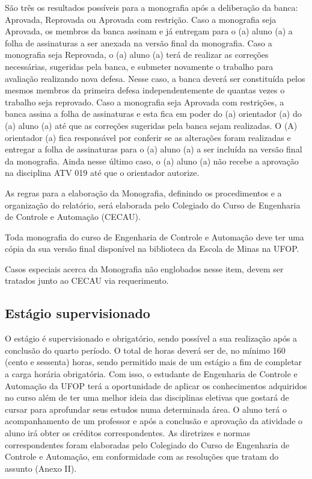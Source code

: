 São três os resultados possíveis para a monografia após a deliberação da banca: Aprovada, Reprovada ou Aprovada com restrição. Caso a monografia seja Aprovada, os membros da banca assinam e já entregam para o (a) aluno (a) a folha de assinaturas a ser anexada na versão final da monografia. Caso a monografia seja Reprovada, o (a) aluno (a) terá de realizar as correções necessárias, sugeridas pela banca, e submeter novamente o trabalho para avaliação realizando nova defesa. Nesse caso, a banca deverá ser constituída pelos mesmos membros da primeira defesa independentemente de quantas vezes o trabalho seja reprovado. Caso a monografia seja Aprovada com restrições, a banca assina a folha de assinaturas e esta fica em poder do (a) orientador (a) do (a) aluno (a) até que as correções sugeridas pela banca sejam realizadas. O (A) orientador (a) fica responsável por conferir se as alterações foram realizadas e entregar a folha de assinaturas para o (a) aluno (a) a ser incluída na versão final da monografia. Ainda nesse último caso, o (a) aluno (a) não recebe a aprovação na disciplina ATV 019 até que o orientador autorize.

As regras para a elaboração da Monografia, definindo os procedimentos e a organização do relatório, será elaborada pelo Colegiado do Curso de Engenharia de Controle e Automação (CECAU).

Toda monografia do curso de Engenharia de Controle e Automação deve ter uma cópia da sua versão final disponível na biblioteca da Escola de Minas na UFOP.

Casos especiais acerca da Monografia não englobados nesse item, devem ser tratados junto ao CECAU via requerimento. 

\subsection*{Estágio supervisionado}
O estágio é supervisionado e obrigatório, sendo possível a sua realização após a conclusão do quarto período. O total de horas deverá ser de, no mínimo 160 (cento e sessenta) horas, sendo permitido mais de um estágio a fim de completar a carga horária obrigatória.  Com isso, o estudante de Engenharia de Controle e Automação da UFOP terá a oportunidade de aplicar os conhecimentos adquiridos no curso além de ter uma melhor ideia das disciplinas eletivas que gostará de cursar para aprofundar seus estudos numa determinada área. O aluno terá o acompanhamento de um professor e após a conclusão e aprovação da atividade o aluno irá obter os créditos correspondentes. As diretrizes e normas correspondentes foram elaboradas pelo Colegiado do Curso de Engenharia de Controle e Automação, em conformidade com as resoluções que tratam do assunto (Anexo II).

